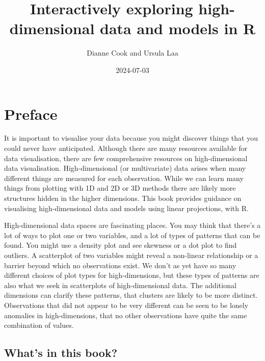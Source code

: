 \documentclass[
  letterpaper,
]{krantz}
\title{Interactively exploring high-dimensional data and models in R}
\author{Dianne Cook and Ursula Laa}
\date{2024-07-03}
\renewcommand*\contentsname{Table of contents}
\newcommand\contentsname{Table of contents}
\begin{document}
\maketitle

\renewcommand*\contentsname{Contents}
{
\hypersetup{linkcolor=}
\setcounter{tocdepth}{1}
\tableofcontents
}

\chapter*{Preface}\label{preface}


It is important to visualise your data because you might discover things
that you could never have anticipated. Although there are many resources
available for data visualisation, there are few comprehensive resources
on high-dimensional data visualisation. High-dimensional (or
multivariate) data arises when many different things are measured for
each observation. While we can learn many things from plotting with 1D
and 2D or 3D methods there are likely more structures hidden in the
higher dimensions. This book provides guidance on visualising
high-dimensional data and models using linear projections, with R.

High-dimensional data spaces are fascinating places. You may think that
there's a lot of ways to plot one or two variables, and a lot of types
of patterns that can be found. You might use a density plot and see
skewness or a dot plot to find outliers. A scatterplot of two variables
might reveal a non-linear relationship or a barrier beyond which no
observations exist. We don't as yet have so many different choices of
plot types for high-dimensions, but these types of patterns are also
what we seek in scatterplots of high-dimensional data. The additional
dimensions can clarify these patterns, that clusters are likely to be
more distinct. Observations that did not appear to be very different can
be seen to be lonely anomalies in high-dimensions, that no other
observations have quite the same combination of values.

\section*{What's in this book?}\label{whats-in-this-book}

\end{document}
